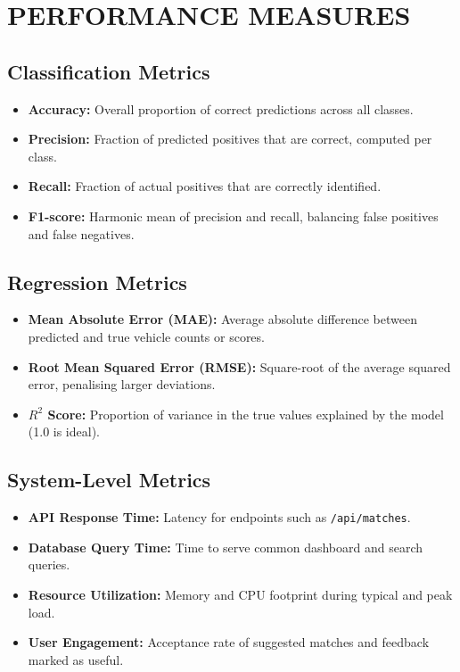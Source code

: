\documentclass[12pt,a4paper]{report}
\let\origsection\section
\renewcommand{\section}{\needspace{4\baselineskip}\origsection}
\begin{document}

\chapter{PERFORMANCE MEASURES}
\thispagestyle{fancy}

\section{Classification Metrics}

\begin{itemize}[noitemsep]
    \item \textbf{Accuracy:} Overall proportion of correct predictions across all classes.
    \item \textbf{Precision:} Fraction of predicted positives that are correct, computed per class.
    \item \textbf{Recall:} Fraction of actual positives that are correctly identified.
    \item \textbf{F1-score:} Harmonic mean of precision and recall, balancing false positives and false negatives.
\end{itemize}

\section{Regression Metrics}

\begin{itemize}[noitemsep]
    \item \textbf{Mean Absolute Error (MAE):} Average absolute difference between predicted and true vehicle counts or scores.
    \item \textbf{Root Mean Squared Error (RMSE):} Square-root of the average squared error, penalising larger deviations.
    \item \textbf{$R^2$ Score:} Proportion of variance in the true values explained by the model (1.0 is ideal).
\end{itemize}

\section{System-Level Metrics}

\begin{itemize}[noitemsep]
    \item \textbf{API Response Time:} Latency for endpoints such as \texttt{/api/matches}.
    \item \textbf{Database Query Time:} Time to serve common dashboard and search queries.
    \item \textbf{Resource Utilization:} Memory and CPU footprint during typical and peak load.
    \item \textbf{User Engagement:} Acceptance rate of suggested matches and feedback marked as useful.
\end{itemize}
\end{document}
